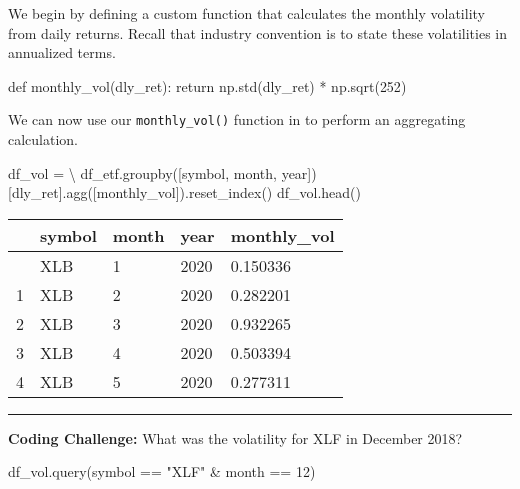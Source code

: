 \documentclass[
  letterpaper,
  DIV=11,
  numbers=noendperiod]{scrreprt}
\newenvironment{Shaded}{\begin{snugshade}}{\end{snugshade}}
\newcommand{\ControlFlowTok}[1]{\textcolor[rgb]{0.00,0.23,0.31}{#1}}
\newcommand{\DecValTok}[1]{\textcolor[rgb]{0.68,0.00,0.00}{#1}}
\newcommand{\KeywordTok}[1]{\textcolor[rgb]{0.00,0.23,0.31}{#1}}
\newcommand{\NormalTok}[1]{\textcolor[rgb]{0.00,0.23,0.31}{#1}}
\newcommand{\OperatorTok}[1]{\textcolor[rgb]{0.37,0.37,0.37}{#1}}
\newcommand{\StringTok}[1]{\textcolor[rgb]{0.13,0.47,0.30}{#1}}
\begin{document}
We begin by defining a custom function that calculates the monthly
volatility from daily returns. Recall that industry convention is to
state these volatilities in annualized terms.

\begin{Shaded}
\begin{Highlighting}[]
\KeywordTok{def}\NormalTok{ monthly\_vol(dly\_ret):}
    \ControlFlowTok{return}\NormalTok{ np.std(dly\_ret) }\OperatorTok{*}\NormalTok{ np.sqrt(}\DecValTok{252}\NormalTok{)}
\end{Highlighting}
\end{Shaded}

We can now use our \texttt{monthly\_vol()} function in to perform an
aggregating calculation.

\begin{Shaded}
\begin{Highlighting}[]
\NormalTok{df\_vol }\OperatorTok{=} \OperatorTok{\textbackslash{}}
\NormalTok{    df\_etf.groupby([}\StringTok{\textquotesingle{}symbol\textquotesingle{}}\NormalTok{, }\StringTok{\textquotesingle{}month\textquotesingle{}}\NormalTok{, }\StringTok{\textquotesingle{}year\textquotesingle{}}\NormalTok{])[}\StringTok{\textquotesingle{}dly\_ret\textquotesingle{}}\NormalTok{].agg([monthly\_vol]).reset\_index()}
\NormalTok{df\_vol.head()}
\end{Highlighting}
\end{Shaded}

\begin{longtable}[]{@{}lllll@{}}
\toprule\noalign{}
& symbol & month & year & monthly\_vol \\
\midrule\noalign{}
\endhead
\bottomrule\noalign{}
\endlastfoot
0 & XLB & 1 & 2020 & 0.150336 \\
1 & XLB & 2 & 2020 & 0.282201 \\
2 & XLB & 3 & 2020 & 0.932265 \\
3 & XLB & 4 & 2020 & 0.503394 \\
4 & XLB & 5 & 2020 & 0.277311 \\
\end{longtable}

\begin{center}\rule{0.5\linewidth}{0.5pt}\end{center}

\textbf{Coding Challenge:} What was the volatility for XLF in December
2018?

\begin{Shaded}
\begin{Highlighting}[]
\NormalTok{df\_vol.query(}\StringTok{\textquotesingle{}symbol == "XLF" \& month == 12\textquotesingle{}}\NormalTok{)}
\end{Highlighting}
\end{Shaded}
\end{document}

